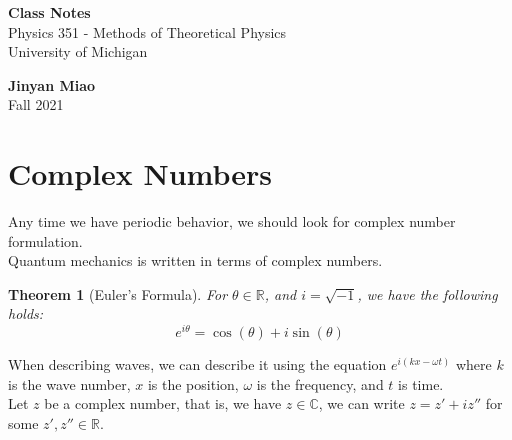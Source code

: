 \documentclass[11pt]{article}
\theoremstyle{break}
\theoremstyle{break}
\newtheorem{thm}{Theorem}[section]
\newcommand{\R}{\mathbb{R}}
\newcommand{\Complex}{\mathbb{C}}
\begin{document}
	\begin{titlepage}
		\begin{center}
			\vspace*{\fill}
			\Huge \color{red}
				\textbf{Class Notes}\\
			\vspace{0.5cm}			
			\Large \color{black}
				Physics 351 - Methods of Theoretical Physics\\	
				University of Michigan\\
			\vspace{3cm}

			
			\vspace{5cm}
			\LARGE
				\textbf{Jinyan Miao}\\
				Fall 2021\\
			\vspace{5cm}

		\vspace*{\fill}
		\end{center}			
	\end{titlepage}

\newpage
\section{\color{red} Complex Numbers}
Any time we have periodic behavior, we should look for complex number formulation.\\
Quantum mechanics is written in terms of complex numbers.\\ 

\begin{thm}[Euler's Formula]
For $\theta \in \R$, and $i = \sqrt{-1}$, we have the following holds:
$$e^{i\theta} = \cos(\theta)+i\sin(\theta)$$
\end{thm}

When describing waves, we can describe it using the equation $e^{i(kx-\omega t)}$ where $k$ is the wave number, $x$ is the position, $\omega$ is the frequency, and $t$ is time.\\



Let $z$ be a complex number, that is, we have $z \in \Complex$, we can write $z = z'+iz''$ for some $z',z'' \in \R$.
\end{document}
